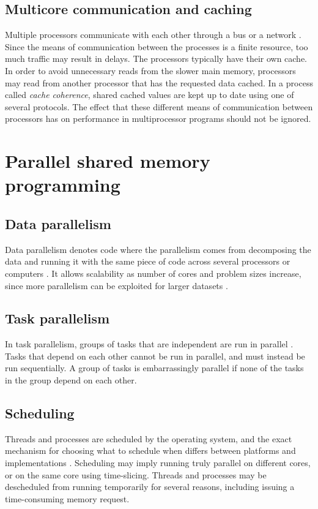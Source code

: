 \subsection{Multicore communication and caching}
Multiple processors communicate with each other through a bus or a network \cite[p. 472-476]{herlihy_2012_art_taomprr}. Since the
means of communication between the processes is a finite resource, too much traffic may result in delays. The processors typically
have their own cache. In order to avoid unnecessary reads from the slower main memory, processors may read from another processor
that has the requested data cached. In a process called \emph{cache coherence}, shared cached values are kept up to date using one
of several protocols. The effect that these different means of communication between processors has on performance in
multiprocessor programs should not be ignored.

\section{Parallel shared memory programming}

\subsection{Data parallelism}
Data parallelism denotes code where the parallelism comes from decomposing the data and running it with the same piece of code
across several processors or computers \cite{singh_2013_parallel_padpwprfmm}. It allows scalability as number of cores and problem
sizes increase, since more parallelism can be exploited for larger datasets \cite[p. 24]{mccool_2012_structured_spppfec}.

\subsection{Task parallelism}
In task parallelism, groups of tasks that are independent are run in parallel \cite{chow_2015_pipeline_ppiaote}.
Tasks that depend on each other cannot be run in parallel, and must instead be run sequentially.
A group of tasks is embarrassingly parallel if none of the tasks in the group depend on each other.

\subsection{Scheduling}
Threads and processes are scheduled by the operating system, and the exact mechanism for choosing what to schedule when differs
between platforms and implementations \cite[p. 472]{herlihy_2012_art_taomprr}. Scheduling may imply running truly parallel
on different cores, or on the same core using time-slicing. Threads and processes may be descheduled from running temporarily for several
reasons, including issuing a time-consuming memory request.

